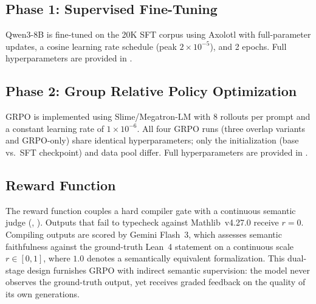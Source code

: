\documentclass[11pt,a4paper]{article}
\begin{document}
\subsection{Phase 1: Supervised Fine-Tuning}\label{sec:sft_training}

Qwen3-8B is fine-tuned on the 20K SFT corpus using Axolotl with full-parameter updates, a cosine learning rate schedule (peak $2 \times 10^{-5}$), and 2 epochs. Full hyperparameters are provided in .

\subsection{Phase 2: Group Relative Policy Optimization}\label{sec:grpo_training}

GRPO \citep{shao2024deepseekmath} is implemented using Slime/Megatron-LM with 8 rollouts per prompt and a constant learning rate of $1 \times 10^{-6}$. All four GRPO runs (three overlap variants and GRPO-only) share identical hyperparameters; only the initialization (base vs.\ SFT checkpoint) and data pool differ. Full hyperparameters are provided in .

\subsection{Reward Function}\label{sec:reward}

The reward function couples a hard compiler gate with a continuous semantic judge (, ). Outputs that fail to typecheck against Mathlib~v4.27.0 receive $r{=}0$. Compiling outputs are scored by Gemini Flash~3, which assesses semantic faithfulness against the ground-truth Lean~4 statement on a continuous scale $r \in [0, 1]$, where $1.0$ denotes a semantically equivalent formalization. This dual-stage design furnishes GRPO with indirect semantic supervision: the model never observes the ground-truth output, yet receives graded feedback on the quality of its own generations.
\end{document}
